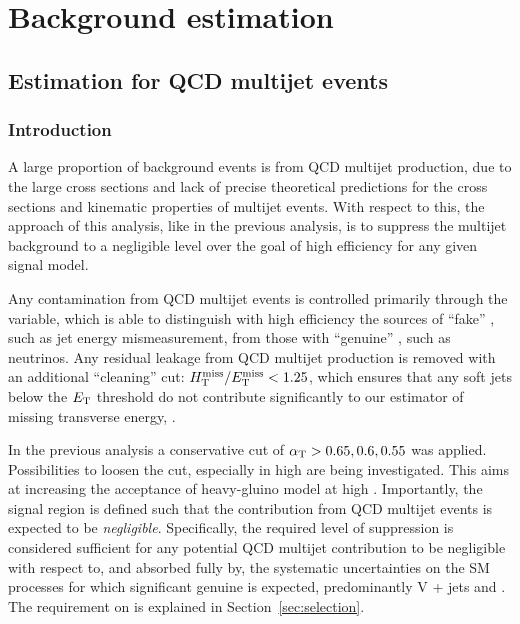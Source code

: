 \section{Background estimation}
\label{sec:background}

\subsection{Estimation for QCD multijet events \label{sec:qcd}}
\subsubsection{Introduction}

A large proportion of background events is from QCD multijet production, due to the large cross sections and lack of precise theoretical
predictions for the cross sections and kinematic properties of multijet events. With respect to this, the approach of this analysis, like in the previous analysis, is to suppress the multijet background to a negligible level over the goal of high efficiency for any given signal model.
 
Any contamination from QCD multijet events is controlled primarily through the \alphat variable, which is able to distinguish with high efficiency the sources of ``fake'' \met, such as jet energy mismeasurement, from those with ``genuine'' \met, such as neutrinos. Any residual leakage from QCD multijet production is removed with an additional ``\met cleaning'' cut: $\mbox{$\mbox{$H_{\rm T}^{\rm miss}$} / \mbox{$E_\text{T}^{\rm miss}$}$} < 1.25$, which ensures that any soft jets below the ${E_{\text T}}$ threshold do not contribute significantly to our estimator of missing transverse energy, \mht.

In the previous analysis a conservative cut of $\alpha_{\text{T}} > 0.65,0.6,0.55$ was applied. Possibilities to loosen the \alphat cut, especially in high \scalht are being investigated. This aims at increasing the acceptance of heavy-gluino model at high \scalht. Importantly, the signal region is defined such that the contribution from QCD multijet events is expected to be {\it negligible}. Specifically, the required level of suppression is considered sufficient for any potential QCD multijet contribution to be negligible with respect to, and absorbed fully by, the systematic uncertainties on the SM processes for which significant genuine \met is expected, predominantly V + jets and \ttbar. The requirement on \alphat is explained in Section~\ref{sec:selection}.

